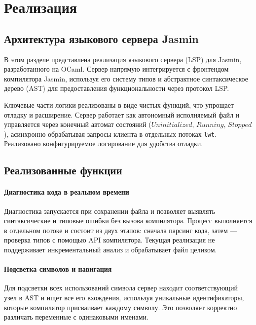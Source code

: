 \chapter{Реализация}
\label{chap:impl}

\section{Архитектура языкового сервера Jasmin}

В этом разделе представлена реализация языкового сервера (LSP) для Jasmin,
разработанного на OCaml. Сервер напрямую интегрируется с фронтендом компилятора
Jasmin, используя его систему типов и абстрактное синтаксическое дерево (AST)
для предоставления функциональности через протокол LSP.

Ключевые части логики реализованы в виде чистых функций, что упрощает отладку и
расширение. Сервер работает как автономный исполняемый файл и управляется через
конечный автомат состояний ($Uninitialized$, $Running$, $Stopped$), асинхронно
обрабатывая запросы клиента в отдельных потоках \texttt{lwt}. Реализовано
конфигурируемое логирование для удобства отладки.

\section{Реализованные функции}

\label{impl:code-diagnostics}

\subsubsection*{Диагностика кода в реальном времени} 

Диагностика запускается при сохранении файла и позволяет выявлять синтаксические
и типовые ошибки без вызова компилятора. Процесс выполняется в отдельном потоке
и состоит из двух этапов: сначала парсинг кода, затем — проверка типов с помощью
API компилятора. Текущая реализация не поддерживает инкрементальный анализ и
обрабатывает файл целиком.

\subsubsection*{Подсветка символов и навигация}

Для подсветки всех использований символа сервер находит соответствующий узел в
AST и ищет все его вхождения, используя уникальные идентификаторы, которые
компилятор присваивает каждому символу. Это позволяет корректно различать
переменные с одинаковыми именами.

